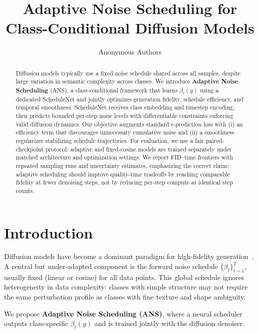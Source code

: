 \title{Adaptive Noise Scheduling for Class-Conditional Diffusion Models}
\author{Anonymous Authors}
\date{}


\maketitle

\begin{abstract}
Diffusion models typically use a fixed noise schedule shared across all samples, despite large variation in semantic complexity across classes. We introduce \textbf{Adaptive Noise Scheduling} (ANS), a class-conditional framework that learns $\beta_t(y)$ using a dedicated ScheduleNet and jointly optimizes generation fidelity, schedule efficiency, and temporal smoothness. ScheduleNet receives class embedding and timestep encoding, then predicts bounded per-step noise levels with differentiable constraints enforcing valid diffusion dynamics. Our objective augments standard $\epsilon$-prediction loss with (i) an efficiency term that discourages unnecessary cumulative noise and (ii) a smoothness regularizer stabilizing schedule trajectories. For evaluation, we use a fair paired-checkpoint protocol: adaptive and fixed-cosine models are trained separately under matched architecture and optimization settings. We report FID--time frontiers with repeated sampling runs and uncertainty estimates, emphasizing the correct claim: adaptive scheduling should improve quality-time tradeoffs by reaching comparable fidelity at fewer denoising steps, not by reducing per-step compute at identical step counts.
\end{abstract}

\section{Introduction}
Diffusion models have become a dominant paradigm for high-fidelity generation~\cite{ho2020ddpm,nichol2021improved,dhariwal2021guided}. A central but under-adapted component is the forward noise schedule $\{\beta_t\}_{t=1}^T$, usually fixed (linear or cosine) for all data points. This global schedule ignores heterogeneity in data complexity: classes with simple structure may not require the same perturbation profile as classes with fine texture and shape ambiguity.

We propose \textbf{Adaptive Noise Scheduling (ANS)}, where a neural scheduler outputs class-specific $\beta_t(y)$ and is trained jointly with the diffusion denoiser.

